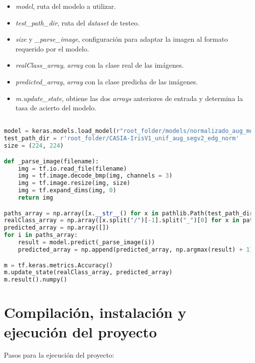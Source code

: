 {\begin{itemize}
    \item \textit{model}, ruta del modelo a utilizar.
    \item \textit{test\_path\_dir}, ruta del \textit{dataset} de testeo.
    \item \textit{size} y \textit{\_parse\_image}, configuración para adaptar la imagen al formato requerido por el modelo.
    \item \textit{realClass\_array}, \textit{array} con la clase real de las imágenes.
    \item \textit{predicted\_array}, \textit{array} con la clase predicha de las imágenes.
    \item \textit{m.update\_state}, obtiene las dos \textit{arrays} anteriores de entrada y determina la tasa de acierto del modelo.
\end{itemize}

\begin{lstlisting}[language=Python] 

model = keras.models.load_model(r"root_folder/models/normalizado_aug_modelv1")
test_path_dir = r'root_folder/CASIA-IrisV1_unif_aug_segv2_edg_norm'
size = (224, 224)

def _parse_image(filename):
    img = tf.io.read_file(filename)
    img = tf.image.decode_bmp(img, channels = 3)
    img = tf.image.resize(img, size)
    img = tf.expand_dims(img, 0)
    return img

paths_array = np.array([x.__str__() for x in pathlib.Path(test_path_dir).rglob('*.bmp')])
realClass_array = np.array([x.split("/")[-1].split("_")[0] for x in paths_array]).astype(int)
predicted_array = np.array([])
for i in paths_array:
    result = model.predict(_parse_image(i))
    predicted_array = np.append(predicted_array, np.argmax(result) + 1)

m = tf.keras.metrics.Accuracy()
m.update_state(realClass_array, predicted_array)
m.result().numpy()

\end{lstlisting}

\section{Compilación, instalación y ejecución del proyecto}

Pasos para la ejecución del proyecto:

}
